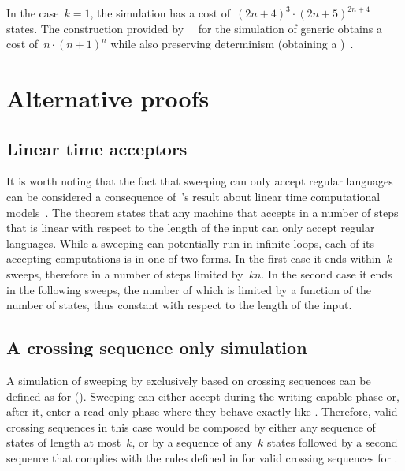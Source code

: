 In the case~$k=1$, the simulation has a cost of~$(2n+4)^3\cdot(2n+5)^{2n+4}$ states.
The construction provided by~\citeauthor{PigPis14}~\cite{PigPis14} for the simulation of generic \ODLAs obtains a cost of~$n\cdot (n+1)^n$ while also preserving determinism (\ie obtaining a \ODFA)~\cite{PigPis14}.



\section{Alternative proofs}\label{sec:alt-proofs}


\subsection{Linear time acceptors}
It is worth noting that the fact that sweeping \kDLAs can only accept regular languages can be considered a consequence of~\citeauthor{Hen65}'s result about linear time computational models~\cite{Hen65}.
The theorem states that any machine that accepts in a number of steps that is linear with respect to the length of the input can only accept regular languages.
While a sweeping \kLA can potentially run in infinite loops, each of its accepting computations is in one of two forms.
In the first case it ends within~$k$ sweeps, therefore in a number of steps limited by~$kn$.
In the second case it ends in the following sweeps, the number of which is limited by a function of the number of states, thus constant with respect to the length of the input.


\subsection{A crossing sequence only simulation}
A simulation of sweeping \kDLAs by \ONFAs exclusively based on crossing sequences can be defined as for \TDFAs ().
Sweeping \kDLAs can either accept during the writing capable phase or, after it, enter a read only phase where they behave exactly like \TDFAs.
Therefore, valid crossing sequences in this case would be composed by either any sequence of states of length at most~$k$, or by a sequence of any~$k$ states followed by a second sequence that complies with the rules defined in  for valid crossing sequences for \TDFAs.

